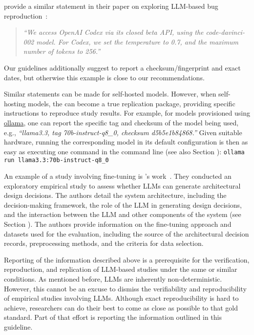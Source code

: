 \citeauthor{DBLP:conf/icse/KangYY23} provide a similar statement in their paper on exploring LLM-based bug reproduction~\cite{DBLP:conf/icse/KangYY23}:

\begin{quote}
\small
\it
``We access OpenAI Codex via its closed beta API, using the code-davinci-002 model. For Codex, we set the temperature to 0.7, and the maximum number of tokens to 256.''
\end{quote}

Our guidelines additionally suggest to report a checksum/fingerprint and exact dates, but otherwise this example is close to our recommendations. 

Similar statements can be made for self-hosted models.
However, when self-hosting models, the \supplementarymaterial can become a true replication package, providing specific instructions to reproduce study results.
For example, for models provisioned using \href{https://ollama.com/library/}{ollama}, one can report the specific tag and checksum of the model being used, e.g., \emph{``llama3.3, tag 70b-instruct-q8\_0, checksum d5b5e1b84868.''}
Given suitable hardware, running the corresponding model in its default configuration is then as easy as executing one command in the command line (see also Section \openllm):
\texttt{ollama run llama3.3:70b-instruct-q8\_0}

An example of a study involving fine-tuning is \citeauthor{DBLP:conf/icsa/DharVV24}'s work~\cite{DBLP:conf/icsa/DharVV24}.
They conducted an exploratory empirical study to assess whether LLMs can generate architectural design decisions.
The authors detail the system architecture, including the decision-making framework, the role of the LLM in generating design decisions, and the interaction between the LLM and other components of the system (see Section \toolarchitecture).
The authors provide information on the fine-tuning approach and datasets used for the evaluation, including the source of the architectural decision records, preprocessing methods, and the criteria for data selection. 


Reporting of the information described above is a prerequisite for the verification, reproduction, and replication of LLM-based studies under the same or similar conditions.
As mentioned before, LLMs are inherently non-deterministic. 
However, this cannot be an excuse to dismiss the verifiability and reproducibility of empirical studies involving LLMs.
Although exact reproducibility is hard to achieve, researchers can do their best to come as close as possible to that gold standard.
Part of that effort is reporting the information outlined in this guideline. 


